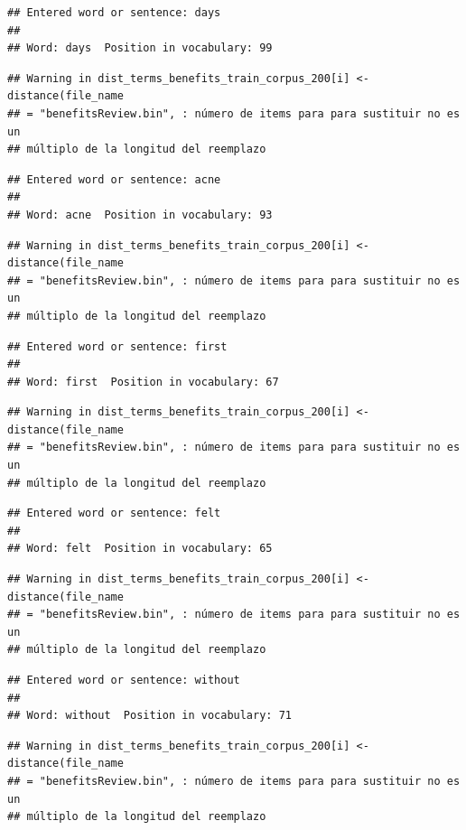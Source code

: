 \documentclass[spanish,]{article}
\begin{document}
\begin{verbatim}
## Entered word or sentence: days
## 
## Word: days  Position in vocabulary: 99
\end{verbatim}

\begin{verbatim}
## Warning in dist_terms_benefits_train_corpus_200[i] <- distance(file_name
## = "benefitsReview.bin", : número de items para para sustituir no es un
## múltiplo de la longitud del reemplazo
\end{verbatim}

\begin{verbatim}
## Entered word or sentence: acne
## 
## Word: acne  Position in vocabulary: 93
\end{verbatim}

\begin{verbatim}
## Warning in dist_terms_benefits_train_corpus_200[i] <- distance(file_name
## = "benefitsReview.bin", : número de items para para sustituir no es un
## múltiplo de la longitud del reemplazo
\end{verbatim}

\begin{verbatim}
## Entered word or sentence: first
## 
## Word: first  Position in vocabulary: 67
\end{verbatim}

\begin{verbatim}
## Warning in dist_terms_benefits_train_corpus_200[i] <- distance(file_name
## = "benefitsReview.bin", : número de items para para sustituir no es un
## múltiplo de la longitud del reemplazo
\end{verbatim}

\begin{verbatim}
## Entered word or sentence: felt
## 
## Word: felt  Position in vocabulary: 65
\end{verbatim}

\begin{verbatim}
## Warning in dist_terms_benefits_train_corpus_200[i] <- distance(file_name
## = "benefitsReview.bin", : número de items para para sustituir no es un
## múltiplo de la longitud del reemplazo
\end{verbatim}

\begin{verbatim}
## Entered word or sentence: without
## 
## Word: without  Position in vocabulary: 71
\end{verbatim}

\begin{verbatim}
## Warning in dist_terms_benefits_train_corpus_200[i] <- distance(file_name
## = "benefitsReview.bin", : número de items para para sustituir no es un
## múltiplo de la longitud del reemplazo
\end{verbatim}
\end{document}

